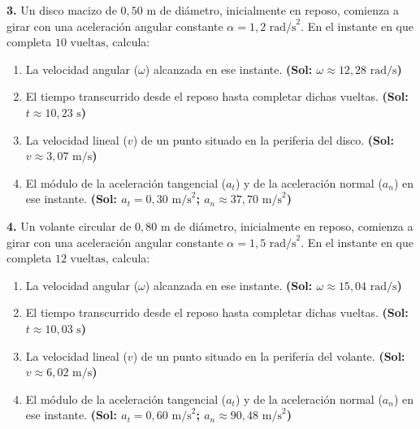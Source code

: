 \documentclass[11pt,a4paper]{article}
\begin{document}
\vspace{0.6cm}
\noindent\textbf{3.} Un disco macizo de $0{,}50\text{ m}$ de diámetro, inicialmente en reposo, comienza a girar con una aceleración angular constante $\alpha = 1{,}2\text{ rad/s}^2$. En el instante en que completa $10\text{ vueltas}$, calcula:
\begin{enumerate}[label=\textbf{\alph*)}, leftmargin=2em, itemsep=4pt]
    \item La velocidad angular ($\omega$) alcanzada en ese instante. \hfill \textbf{(Sol: $\omega \approx 12{,}28\text{ rad/s}$)}
    \item El tiempo transcurrido desde el reposo hasta completar dichas vueltas. \hfill \textbf{(Sol: $t \approx 10{,}23\text{ s}$)}
    \item La velocidad lineal ($v$) de un punto situado en la periferia del disco. \hfill \textbf{(Sol: $v \approx 3{,}07\text{ m/s}$)}
    \item El módulo de la aceleración tangencial ($a_t$) y de la aceleración normal ($a_n$) en ese instante. \hfill \textbf{(Sol: $a_t = 0{,}30\text{ m/s}^2$; $a_n \approx 37{,}70\text{ m/s}^2$)}
\end{enumerate}

\vspace{0.6cm}
\noindent\textbf{4.} Un volante circular de $0{,}80\text{ m}$ de diámetro, inicialmente en reposo, comienza a girar con una aceleración angular constante $\alpha = 1{,}5\text{ rad/s}^2$. En el instante en que completa $12\text{ vueltas}$, calcula:
\begin{enumerate}[label=\textbf{\alph*)}, leftmargin=2em, itemsep=4pt]
    \item La velocidad angular ($\omega$) alcanzada en ese instante. \hfill \textbf{(Sol: $\omega \approx 15{,}04\text{ rad/s}$)}
    \item El tiempo transcurrido desde el reposo hasta completar dichas vueltas. \hfill \textbf{(Sol: $t \approx 10{,}03\text{ s}$)}
    \item La velocidad lineal ($v$) de un punto situado en la periferia del volante. \hfill \textbf{(Sol: $v \approx 6{,}02\text{ m/s}$)}
    \item El módulo de la aceleración tangencial ($a_t$) y de la aceleración normal ($a_n$) en ese instante. \hfill \textbf{(Sol: $a_t = 0{,}60\text{ m/s}^2$; $a_n \approx 90{,}48\text{ m/s}^2$)}
\end{enumerate}
\end{document}
